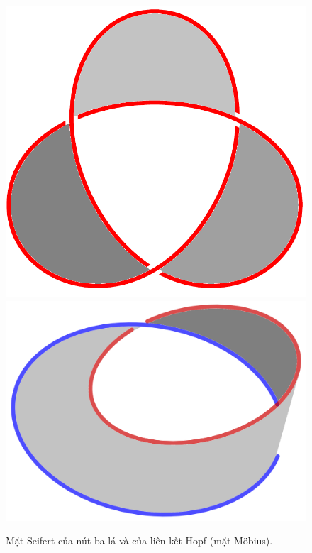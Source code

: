 \documentclass[12pt]{article}
\begin{document}
\begin{figure}[h!]
    \centering
    \includegraphics[scale = .3]{seifert1} \hspace{2cm}
    \includegraphics[scale = .2]{seifert2}
    \caption{Mặt Seifert của nút ba lá và của liên kết Hopf (mặt M\"obius).}
    \label{h12}
\end{figure}
\end{document}

